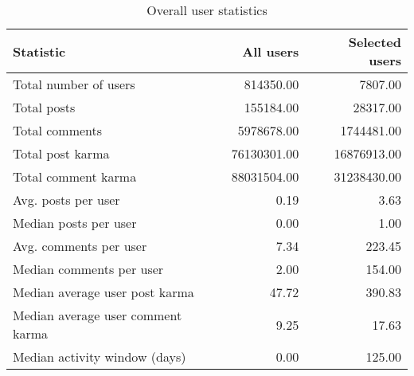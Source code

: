 \begin{table}[H]
\centering
\begin{tabular}{lrr}
\toprule
 Statistic                         &   All users &   Selected users \\
\midrule
 Total number of users             &   814350.00 &          7807.00 \\
 Total posts                       &   155184.00 &         28317.00 \\
 Total comments                    &  5978678.00 &       1744481.00 \\
 Total post karma                  & 76130301.00 &      16876913.00 \\
 Total comment karma               & 88031504.00 &      31238430.00 \\
 Avg. posts per user               &        0.19 &             3.63 \\
 Median posts per user             &        0.00 &             1.00 \\
 Avg. comments per user            &        7.34 &           223.45 \\
 Median comments per user          &        2.00 &           154.00 \\
 Median average user post karma    &       47.72 &           390.83 \\
 Median average user comment karma &        9.25 &            17.63 \\
 Median activity window (days)     &        0.00 &           125.00 \\
\bottomrule
\end{tabular}
\caption{ Overall user statistics }
\vspace{10pt}
\end{table}
